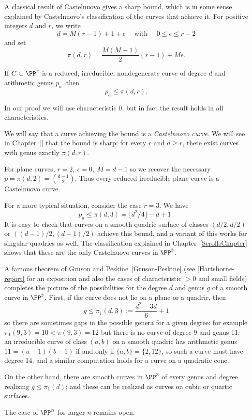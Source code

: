 A classical result of Castelnuovo gives a sharp bound, which is in some sense explained by Castelnuovo's classification of the curves that achieve it. For positive integers $d$ and $r$, we write
$$
 d = M(r-1) + 1 + \epsilon \quad \text{ with } \quad 0 \leq \epsilon \leq r-2
$$
and set
$$
\pi(d,r) = \frac{M(M-1)}{2}(r-1) + M\epsilon.
$$

\begin{theorem}\label{Castelnuovo's bound}
If $C \subset \PP^r$ is a reduced, irreducible, nondegenerate curve of degree $d$ and arithmetic genus $p_a$, then
$$
p_a \leq \pi(d,r).
$$
\end{theorem}

In our proof we will use characteristic 0, but in fact the result holds in all characteristics.

We will say that a curve achieving the bound is a \emph{Castelnuovo curve}. We will see in Chapter~\ref{} that the bound is sharp: for every $r$ and $d \geq r$, there exist curves with genus exactly $\pi(d,r)$. 

\begin{example}
For plane curves, $r=2, \ \epsilon = 0, \ M = d-1$ so we recover the necessary $p = \pi(d,2) =  {d-1\choose 2}$. Thus every reduced irreducible
plane curve is a Castelnuovo curve.
\end{example}

\begin{example}For a more typical situation, consider the case $r=3$. We have
$$
p_a \leq \pi(d,3) = \lfloor d^2/4 \rfloor-d+1\, .
$$
It is easy to check that curves on a smooth quadric surface of classes
$(d/2, d/2)$ or $((d-1)/2, (d+1)/2)$
achieve this bound, and a variant of this works for singular quadrics as well. The classification  explained in Chapter~\ref{ScrollsChapter}
shows that these are the only Castelnuovo curves in $\PP^3$.
\end{example}

\begin{fact}
A famous theorem of Gruson and Peskine~\ref{Gruson-Peskine} (see \ref{Hartshorne-report} for an exposition and also the cases of characteristic $>0$ and small fields) completes the picture of the possibilities for the degree $d$ and  genus $g$  of a smooth curve in $\PP^3$. First, if the curve does not lie on a plane or a quadric, then
$$
g\leq \pi_1(d,3) := \frac{d^2-3d}{6} +1
$$
so there are  sometimes gaps in the possible genera for a given degree: for example  $\pi_1(9,3) = 10<\pi(9,3) =12$ but there is
no curve of degree 9 and genus 11: an irreducible curve of class $(a,b)$ on a smooth quadric has arithmetic genus $11 = (a-1)(b-1)$
if and only if $\{a,b\} = \{2,12\}$, so such a curve must have degree 14, and a similar computation holds for a curve on a quadratic cone.

On the other hand, there are smooth curves in $\PP^3$ of every genus and degree realizing $g\leq \pi_1(d)$; and these can be realized as curves
on cubic or quartic surfaces.

The case of $\PP^n$ for larger $n$ remains open. 
\end{fact}

